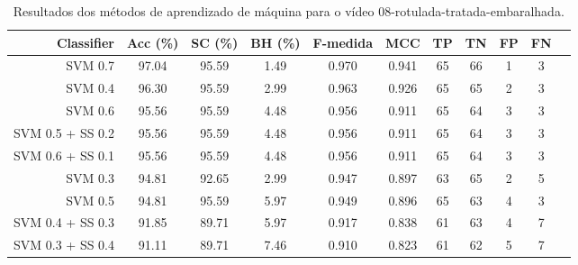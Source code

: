 \begin{table}[!htb]
\centering
\caption{Resultados dos métodos de aprendizado de máquina para o vídeo 08-rotulada-tratada-embaralhada.}
\label{tab:08-rotulada-tratada-embaralhada}
\begin{tabular}{r|c|c|c|c|c|c|c|c|c|c}
\hline\hline
Classifier & Acc (\%) & SC (\%) & BH (\%) & F-medida & MCC & TP & TN & FP & FN \\ \hline
SVM 0.7 & 97.04 & 95.59 & 1.49 & 0.970 & 0.941 & 65 & 66 & 1 & 3 \\ 
SVM 0.4 & 96.30 & 95.59 & 2.99 & 0.963 & 0.926 & 65 & 65 & 2 & 3 \\ 
SVM 0.6 & 95.56 & 95.59 & 4.48 & 0.956 & 0.911 & 65 & 64 & 3 & 3 \\ 
SVM 0.5 + SS 0.2 & 95.56 & 95.59 & 4.48 & 0.956 & 0.911 & 65 & 64 & 3 & 3 \\ 
SVM 0.6 + SS 0.1 & 95.56 & 95.59 & 4.48 & 0.956 & 0.911 & 65 & 64 & 3 & 3 \\ 
SVM 0.3 & 94.81 & 92.65 & 2.99 & 0.947 & 0.897 & 63 & 65 & 2 & 5 \\ 
SVM 0.5 & 94.81 & 95.59 & 5.97 & 0.949 & 0.896 & 65 & 63 & 4 & 3 \\ 
SVM 0.4 + SS 0.3 & 91.85 & 89.71 & 5.97 & 0.917 & 0.838 & 61 & 63 & 4 & 7 \\ 
SVM 0.3 + SS 0.4 & 91.11 & 89.71 & 7.46 & 0.910 & 0.823 & 61 & 62 & 5 & 7 \\ 
\hline\hline
\end{tabular}
\end{table}
